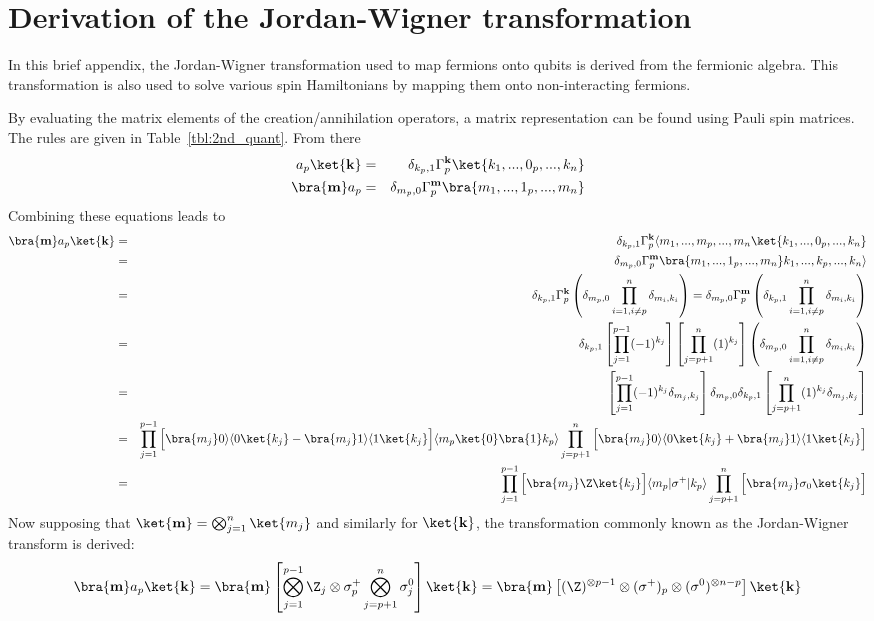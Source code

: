 \documentclass[11pt,oneside,final]{huthesis}%
\begin{document}
\chapter{Derivation of the Jordan-Wigner transformation}\label{appx:JW}
In this brief appendix, the Jordan-Wigner transformation used to map fermions onto qubits is derived from the fermionic algebra.  This transformation is also used to solve various spin Hamiltonians by mapping them onto non-interacting fermions.

By evaluating the matrix elements of the creation/annihilation operators, a matrix representation can be found using Pauli spin matrices.  The rules are given in Table~\ref{tbl:2nd_quant}.  From there
\begin{eqnarray}
	a_p\ket{\mathbf{k}}&=& \delta_{k_p,1}\Gamma_p^{\mathbf{k}}\ket{k_1, ..., 0_p, ..., k_n}\\
	\bra{\mathbf{m}}a_p&=& \delta_{m_p,0}\Gamma_p^{\mathbf{m}}\bra{m_1, ..., 1_p, ..., m_n}
\end{eqnarray}
Combining these equations leads to
\begin{eqnarray*}
	\bra{\mathbf{m}}a_p\ket{\mathbf{k}}&=& \delta_{k_p,1}\Gamma_p^{\mathbf{k}}\langle m_1, ..., m_p, ..., m_n\ket{k_1, ..., 0_p, ..., k_n} \\
&=&\delta_{m_p,0}\Gamma_p^{\mathbf{m}}\bra{m_1, ..., 1_p, ..., m_n}k_1, ..., k_p, ..., k_n\rangle\\
	&=& \delta_{k_p,1}\Gamma_p^{\mathbf{k}}\left(\delta_{m_p,0} \prod_{i=1,i\neq p}^n \delta_{m_i,k_i}\right)= \delta_{m_p,0}\Gamma_p^{\mathbf{m}}\left(\delta_{k_p,1} \prod_{i=1,i\neq p}^n \delta_{m_i,k_i}\right) \\
	&=& \delta_{k_p,1}\left[ \prod_{j=1}^{p-1}(-1)^{k_j} \right]\left[ \prod_{j=p+1}^{n}(1)^{k_j} \right]\left(\delta_{m_p,0} \prod_{i=1,i\neq p}^n \delta_{m_i,k_i}\right)\\
	&=&  \left[ \prod_{j=1}^{p-1}(-1)^{k_j} \delta_{m_j,k_j} \right]\delta_{m_p,0}\delta_{k_p,1}\left[ \prod_{j=p+1}^{n}(1)^{k_j}  \delta_{m_j,k_j}\right]\\
	&=&  \prod_{j=1}^{p-1} \Big[ \bra{m_j} 0\rangle\langle 0 \ket{k_j}-\bra{m_j} 1\rangle\langle 1 \ket{k_j} \Big]\langle m_p\ket{0}\bra{1}k_p\rangle\prod_{j=p+1}^{n}\Big[ \bra{m_j} 0\rangle\langle 0 \ket{k_j}+\bra{m_j} 1\rangle\langle 1 \ket{k_j}\Big]\\
	&=&  \prod_{j=1}^{p-1} \Big[\bra{m_j}  \Z \ket{k_j}\Big]\langle m_p|\sigma^+|k_p\rangle\prod_{j=p+1}^{n}\Big[ \bra{m_j} \sigma_0 \ket{k_j}\Big]
\end{eqnarray*}
Now supposing that $\ket{\mathbf{m}}=\bigotimes_{j=1}^n\ket{m_j}$ and similarly for $\ket{\mathbf{k}}$, the transformation commonly known as the Jordan-Wigner transform is derived:
\begin{equation}
	\bra{\mathbf{m}}a_p\ket{\mathbf{k}}=\bra{\mathbf{m}} \left[ \bigotimes_{j=1}^{p-1}\Z_j\otimes\sigma^+_p\bigotimes_{j=p+1}^n \sigma^0_j\right]\ket{\mathbf{k}}=\bra{\mathbf{m}} \left[ (\Z)^{\otimes p-1}\otimes(\sigma^+)_p\otimes (\sigma^0)^{\otimes n-p} \right] \ket{\mathbf{k}}
\end{equation}
\end{document}
